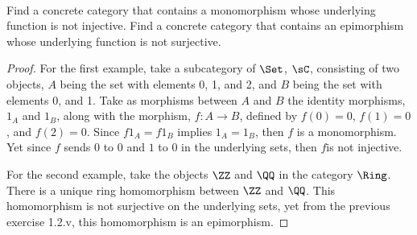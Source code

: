 \documentclass[main.tex]{subfiles}
\begin{document}
\paragraph{}
\begin{exercise}
	Find a concrete category that contains a monomorphism whose underlying
	function is not injective. Find a concrete category that contains an
	epimorphism whose underlying function is not surjective.
\end{exercise}

\begin{proof}
	For the first example, take a subcategory of $\Set$, $\sC$, consisting
	of two objects, $A$ being the set with elements 0, 1, and 2, and $B$ being
	the set with elements 0, and 1. Take as morphisms between $A$ and $B$ the
	identity morphisms, $1_A$ and $1_B$, along with the morphism, $f \colon A
	\rightarrow B$, defined by $f(0) = 0$, $f(1) = 0$, and $f(2) = 0$. Since
	$f1_A = f1_B$ implies $1_A = 1_B$, then $f$ is a monomorphism. Yet since $f$
	sends $0$ to $0$ and $1$ to $0$ in the underlying sets, then $f$is not
	injective.

	For the second example, take the objects $\ZZ$ and $\QQ$ in the
	category $\Ring$. There is a unique ring homomorphism between $\ZZ$ and $\QQ$. This homomorphism is not surjective on the underlying sets,
	yet from the previous exercise 1.2.v, this homomorphism is an epimorphism.
\end{proof}
\end{document}
